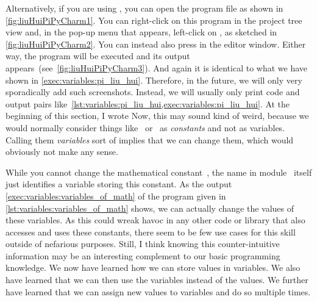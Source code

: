Alternatively, if you are using \pycharm, you can open the program file  as shown in \cref{fig:liuHuiPiPyCharm1}.
You can right-click on this program in the project tree view and, in the pop-up menu that appears, left-click on , as sketched in \cref{fig:liuHuiPiPyCharm2}.
You can instead also press  in the editor window.
Either way, the program will be executed and its output appears~(see~\cref{fig:liuHuiPiPyCharm3}).
And again it is identical to what we have shown in \cref{exec:variables:pi_liu_hui}.
Therefore, in the future, we will only very sporadically add such screenshots.
Instead, we will usually only print code and output pairs like~\cref{lst:variables:pi_liu_hui,exec:variables:pi_liu_hui}.%
%
\endhsection%
%
%
%
\label{sec:variablesCanBeModified}%
%
%
%
At the beginning of this section, I wrote \emph{}
Now, this may sound kind of weird, because we would normally consider things like \numberPi\ or \numberE\ as \emph{constants} and not as variables.
Calling them \emph{variables} sort of implies that we can change them, which would obviously not make any sense.

While you cannot change the mathematical constant~\numberPi, the name  in module~ itself just identifies a variable storing this constant.
As the output \cref{exec:variables:variables_of_math} of the program given in \cref{lst:variables:variables_of_math} shows, we can actually change the values of these variables.
As this could wreak havoc in any other code or library that also accesses and uses these constants, there seem to be few use cases for this skill outside of nefarious purposes.
Still, I think knowing this counter-intuitive information may be an interesting complement to our basic programming knowledge.
%
%
%
%
%
%
\FloatBarrier\endhsection%
%
%
%
We now have learned how we can store values in variables.
We also have learned that we can then use the variables instead of the values.
We further have learned that we can assign new values to variables and do so multiple times.

